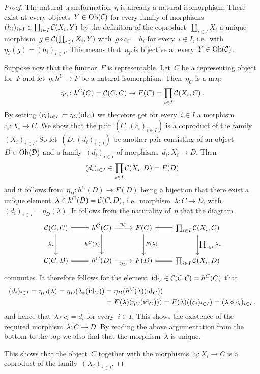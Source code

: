 \begin{proof}
  The natural transformation~$\eta$ is already a natural isomorphism:
  There exist at every objects~$Y \in \operatorname{Ob}(\mathcal{C})$ for every family of morphisms~$(h_i)_{i \in I} \in \prod_{i \in I} \mathcal{C}(X_i, Y)$ by the definition of the coproduct~$\coprod_{i \in I} X_i$ a unique morphism~$g \in \mathcal{C}(\coprod_{i \in I} X_i, Y)$ with~$g \circ c_i = h_i$ for every~$i \in I$, i.e.\ with~$\eta_Y(g) = (h_i)_{i \in I}$.
  This means that~$\eta_Y$ is bijective at every~$Y \in \operatorname{Ob}(\mathcal{C})$.
  
  Suppose now that the functor~$F$ is representable.
  Let~$C$ be a representing object for~$F$ and let~$\eta \colon h^C \to F$ be a natural isomorphism.
  Then~$\eta_C$ is a map
  \[
      \eta_C
    \colon
      h^C(C)
    =
      \mathcal{C}(C,C)
    \to
      F(C)
    =
      \prod_{i \in I} \mathcal{C}(X_i, C) \,.
  \]
  By setting $(c_i)_{i \in I} \coloneqq \eta_C(\operatorname{id}_C)$ we therefore get for every~$i \in I$ a morphism~$c_i \colon X_i \to C$.
  We show that the pair~$(C, (c_i)_{i \in I})$ is a coproduct of the family~$(X_i)_{i \in I}$.
  So let~$(D, (d_i)_{i \in I})$ be another pair consisting of an object~$D \in \operatorname{Ob}(\mathcal{D})$ and a family~$(d_i)_{i \in I}$ of morphisms~$d_i \colon X_i \to D$.
  Then
  \[
        (d_i)_{i \in I}
    \in \prod_{i \in I} \mathcal{C}(X_i, D)
    =   F(D)
  \]
  and it follows from~$\eta_D \colon h^C(D) \to F(D)$ being a bijection that there exist a unique element~$\lambda \in h^C(D) = \mathcal{C}(C,D)$, i.e.\ morphism~$\lambda \colon C \to D$, with~$(d_i)_{i \in I} = \eta_D(\lambda)$.
  It follows from the naturality of~$\eta$ that the diagram
  \[
    \begin{tikzcd}[row sep = large]
        \Ccat(C,C)
        \arrow[equal]{r}
        \arrow{d}[left]{\lambda_*}
      & h^C(C)
        \arrow{r}[above]{\eta_C}
        \arrow{d}[left]{h^C(\lambda)}
      & F(C)
        \arrow{d}[right]{F(\lambda)}
        \arrow[equal]{r}
      & \prod_{i \in I} \Ccat(X_i, C)
        \arrow{d}[right]{\prod_{i \in I} \lambda_*}
      \\
        \Ccat(C,D)
        \arrow[equal]{r}
      & h^C(D)
        \arrow{r}[below]{\eta_D}
      & F(D)
        \arrow[equal]{r}
      & \prod_{i \in I} \Ccat(X_i, D)
    \end{tikzcd}
  \]
  commutes.
  It therefore follows for the element~$\operatorname{id}_C \in \mathcal{C}(\mathcal{C}, \mathcal{C}) = h^C(C)$ that
  \begin{align*}
        (d_i)_{i \in I}
     =  \eta_D( \lambda )
     =  \eta_D( \lambda_*( \operatorname{id}_C) )
    &=  \eta_D( h^C(\lambda)( \operatorname{id}_C ) )  \\
    &=  F(\lambda)( \eta_C( \operatorname{id}_C) ) )
     =  F(\lambda)( (c_i)_{i \in I} )
     =  (\lambda \circ c_i)_{i \in I} \,,
  \end{align*}
  and hence that~$\lambda \circ c_i = d_i$ for every~$i \in I$.
  This shows the existence of the required morphism~$\lambda \colon C \to D$.
  By reading the above argumentation from the bottom to the top we also find that the morphism~$\lambda$ is unique.
  
  This shows that the object~$C$ together with the morphisms~$c_i \colon X_i \to C$ is a coproduct of the family~$(X_i)_{i \in I}$.
\end{proof}



